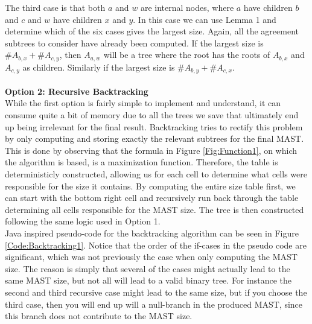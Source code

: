 The third case is that both $a$ and $w$ are internal nodes, where $a$ have children $b$ and $c$ and $w$ have children $x$ and $y$. In this case we can use Lemma 1 and determine which of the six cases gives the largest size. Again, all the agreement subtrees to consider have already been computed. If the largest size is $\#A_{b,x} + \#A_{c,y}$, then $A_{a,w}$ will be a tree where the root has the roots of $A_{b,x}$ and $A_{c,y}$ as children. Similarly if the largest size is $\#A_{b,y} + \#A_{c,x}$.\\
\\
\textbf{Option 2: Recursive Backtracking} \\
While the first option is fairly simple to implement and understand, it can consume quite a bit of memory due to all the trees we save that ultimately end up being irrelevant for the final result. Backtracking tries to rectify this problem by only computing and storing exactly the relevant subtrees for the final MAST. This is done by observing that the formula in Figure \ref{Fig:Function1}, on which the algorithm is based, is a maximization function. Therefore, the table is deterministicly constructed, allowing us for each cell to determine what cells were responsible for the size it contains. By computing the entire size table first, we can start with the bottom right cell and recursively run back through the table determining all cells responsible for the MAST size. The tree is then constructed following the same logic used in Option 1. 
\\
Java inspired pseudo-code for the backtracking algorithm can be seen in Figure \ref{Code:Backtracking1}. Notice that the order of the if-cases in the pseudo code are significant, which was not previously the case when only computing the MAST size. The reason is simply that several of the cases might actually lead to the same MAST size, but not all will lead to a valid binary tree. For instance the second and third recursive case might lead to the same size, but if you choose the third case, then you will end up will a null-branch in the produced MAST, since this branch does not contribute to the MAST size. 
    
